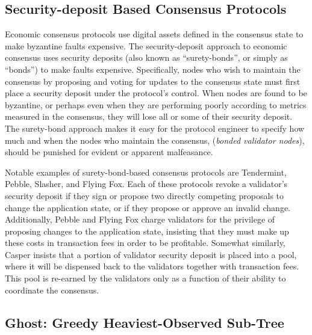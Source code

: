 \documentclass[11pt,a4paper]{article}
\begin{document}
\subsection{Security-deposit Based Consensus Protocols}

Economic consensus protocols use digital assets defined in the consensus state to make byzantine faults expensive. The security-deposit approach to economic consensus uses security deposits (also known as ``surety-bonds'', or simply as ``bonds'') to make faults expensive. Specifically, nodes who wish to maintain the consensus by proposing and voting for updates to the consensus state must first place a security deposit under the protocol's control. When nodes are found to be byzantine, or perhaps even when they are performing poorly according to metrics measured in the consensus, they will lose all or some of their security deposit. The surety-bond approach makes it easy for the protocol engineer to specify how much and when the nodes who maintain the consensus, (\emph{bonded validator nodes}), should be punished for evident or apparent malfeasance.

Notable examples of surety-bond-based consensus protocols are Tendermint\cite{TM}, Pebble\cite{Pebble}, Slasher\cite{Slasher}, and Flying Fox\cite{FlyingFox}. Each of these protocols revoke a validator's security deposit if they sign or propose two directly competing proposals to change the application state, or if they propose or approve an invalid change. Additionally, Pebble and Flying Fox charge validators for the privilege of proposing changes to the application state, insisting that they must make up these costs in transaction fees in order to be profitable. Somewhat similarly, Casper insists that a portion of validator security deposit is placed into a pool, where it will be dispensed back to the validators together with transaction fees. This pool is re-earned by the validators only as a function of their ability to coordinate the consensus. 


\subsection{Ghost: Greedy Heaviest-Observed Sub-Tree}
\end{document}
